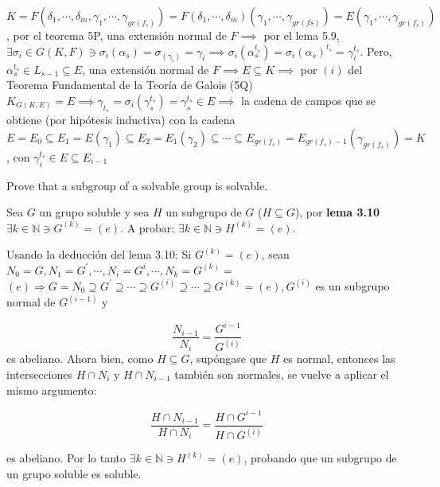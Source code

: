 \begin{problema}[Problema 1]
\begin{dem}
\begin{itemize}
            $K=F(\delta_1,\cdots,\delta_m,\gamma_1,\cdots,\gamma_{gr(f_s)})=F(\delta_1,\cdots,\delta_m)(\gamma_1,\cdots,\gamma_{gr(fs)})=E(\gamma_1,\cdots,\gamma_{gr(f_s)})$, por el teorema 5P, una extensión normal de $F\implies$ por el lema 5.9,$\exists \sigma_i\in G(K,F)\ni \sigma_i(\alpha_s)=\sigma_(\gamma_i)=\gamma_i\implies \sigma_i(\alpha_s^{t_s})=\sigma_i(\alpha_s)^{t_s}=\gamma_i^{t_s}$. Pero, $\alpha_s^{t_s}\in L_{s-1}\subseteq E$, una extensión normal de $F\implies E\subseteq K\implies$ por $(i)$ del Teorema Fundamental de la Teoría de Galois (5Q) $K_{G(K,E)}=E\implies \gamma_{t_s}=\sigma_i(\gamma_s^{t_s})=\gamma_s^{t_s}\in E\implies$ la cadena de campos que se obtiene (por hipótesis inductiva) con la cadena $E=E_0\subseteq E_1=E(\gamma_1)\subseteq E_2=E_1(\gamma_2)\subseteq \cdots \subseteq E_{gr(f_s)}=E_{gr(f_s)-1}(\gamma_{gr(f_s)})=K$, con $\gamma_i^{t_s}\in E\subseteq E_{i-1}$
        \end{itemize}
        
    \end{dem}
\end{problema}

\begin{problema}[Problema 2]
    Prove that a subgroup of a solvable group is solvable.
    \begin{dem}
        Sea $G$ un grupo soluble y sea $H$ un subgrupo de $G$ ($H\subseteq G$), por \textbf{lema 3.10} $\exists k\in\mathbb{N}\ni G^{(k)}=(e)$. A probar: $\exists k\in\mathbb{N}\ni H^{(k)}=(e)$.\bigbreak
        
        Usando la deducción del lema 3.10: Si $G^{(k)}=(e)$, sean $N_0=G, N_1=G^{\prime}, \cdots, N_i=G^i, \cdots, N_k=G^{(k)}=$ $(e) \Longrightarrow G=N_0 \supseteq G^{\prime} \supseteq \cdots \supseteq G^{(i)} \supseteq \cdots \supseteq G^{(k)}=(e), G^{(i)}$ es un subgrupo normal de $G^{(i-1)}$ y
        
        $$\frac{N_{i-1}}{N_i}=\frac{G^{i-1}}{G^{(i)}}$$ 
        es abeliano. Ahora bien, como $H\subseteq G$, supóngase que $H$ es normal, entonces las intersecciones $H\cap N_i$ y $H\cap N_{i-1}$ también son normales, se vuelve a aplicar el mismo argumento:
        
        $$\frac{H\cap N_{i-1}}{H\cap N_i}=\frac{H\cap G^{i-1}}{H\cap G^{(i)}}$$ 
        
        es abeliano. Por lo tanto $\exists k\in\mathbb{N}\ni H^{(k)}=(e)$, probando que un subgrupo de un grupo soluble es soluble.
    
    \end{dem}
\end{problema}

